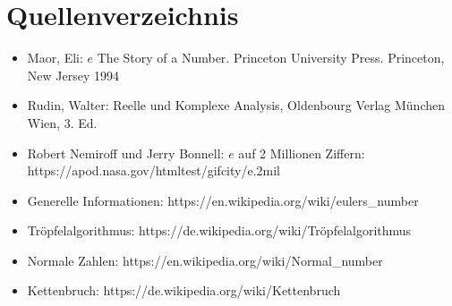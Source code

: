 \newpage
\section*{Quellenverzeichnis}
\begin{itemize}
  \item Maor, Eli: $e$ The Story of a Number. Princeton University Press. Princeton, New Jersey 1994
  \item Rudin, Walter: Reelle und Komplexe Analysis, Oldenbourg Verlag München Wien, 3. Ed.
  \item  Robert Nemiroff und Jerry Bonnell: $e$ auf 2 Millionen Ziffern: https://apod.nasa.gov/htmltest/gifcity/e.2mil
  \item Generelle Informationen: https://en.wikipedia.org/wiki/eulers\_number
  \item Tröpfelalgorithmus: https://de.wikipedia.org/wiki/Tröpfelalgorithmus
  \item Normale Zahlen: https://en.wikipedia.org/wiki/Normal\_number
  \item Kettenbruch: https://de.wikipedia.org/wiki/Kettenbruch
\end{itemize}
